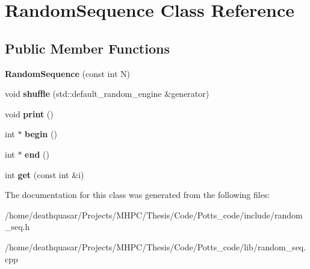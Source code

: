 \hypertarget{class_random_sequence}{}\section{Random\+Sequence Class Reference}
\label{class_random_sequence}
\subsection*{Public Member Functions}
\begin{DoxyCompactItemize}
\item 
\hypertarget{class_random_sequence_a010f044bbdf4e8be029ba7b936e5c7ae}{}{\bfseries Random\+Sequence} (const int N)\label{class_random_sequence_a010f044bbdf4e8be029ba7b936e5c7ae}

\item 
\hypertarget{class_random_sequence_ab6ca117e2c7d36bdcf4b808c4c9a4e3e}{}void {\bfseries shuffle} (std\+::default\+\_\+random\+\_\+engine \&generator)\label{class_random_sequence_ab6ca117e2c7d36bdcf4b808c4c9a4e3e}

\item 
\hypertarget{class_random_sequence_acf065adaf2b78987d23187bdd60081f0}{}void {\bfseries print} ()\label{class_random_sequence_acf065adaf2b78987d23187bdd60081f0}

\item 
\hypertarget{class_random_sequence_ac2483da3051c252afe0fcc0c703774c5}{}int $\ast$ {\bfseries begin} ()\label{class_random_sequence_ac2483da3051c252afe0fcc0c703774c5}

\item 
\hypertarget{class_random_sequence_a457062d456d29e8d8acbbe78f3a964db}{}int $\ast$ {\bfseries end} ()\label{class_random_sequence_a457062d456d29e8d8acbbe78f3a964db}

\item 
\hypertarget{class_random_sequence_a87bbb74fa6a1b4f7c4e1bd07f011c724}{}int {\bfseries get} (const int \&i)\label{class_random_sequence_a87bbb74fa6a1b4f7c4e1bd07f011c724}

\end{DoxyCompactItemize}


The documentation for this class was generated from the following files\+:\begin{DoxyCompactItemize}
\item 
/home/deathquasar/\+Projects/\+M\+H\+P\+C/\+Thesis/\+Code/\+Potts\+\_\+code/include/random\+\_\+seq.\+h\item 
/home/deathquasar/\+Projects/\+M\+H\+P\+C/\+Thesis/\+Code/\+Potts\+\_\+code/lib/random\+\_\+seq.\+cpp\end{DoxyCompactItemize}
